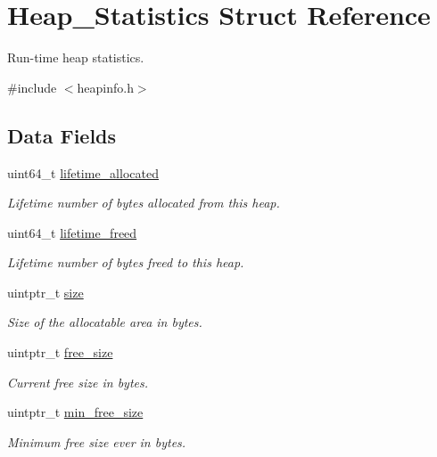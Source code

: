 \hypertarget{structHeap__Statistics}{}\section{Heap\+\_\+\+Statistics Struct Reference}
\label{structHeap__Statistics}


Run-\/time heap statistics.  




{\ttfamily \#include $<$heapinfo.\+h$>$}

\subsection*{Data Fields}
\begin{DoxyCompactItemize}
\item 
uint64\+\_\+t \mbox{\hyperlink{structHeap__Statistics_a511f505d0322a9217c82a5ef84e91900}{lifetime\+\_\+allocated}}
\begin{DoxyCompactList}\small\item\em Lifetime number of bytes allocated from this heap. \end{DoxyCompactList}\item 
uint64\+\_\+t \mbox{\hyperlink{structHeap__Statistics_a3b6ed31e7d4ef8b250ab5befc0cdcac9}{lifetime\+\_\+freed}}
\begin{DoxyCompactList}\small\item\em Lifetime number of bytes freed to this heap. \end{DoxyCompactList}\item 
uintptr\+\_\+t \mbox{\hyperlink{structHeap__Statistics_ab98e1923a329bf8fb80326ae6a4ee6be}{size}}
\begin{DoxyCompactList}\small\item\em Size of the allocatable area in bytes. \end{DoxyCompactList}\item 
uintptr\+\_\+t \mbox{\hyperlink{structHeap__Statistics_ac696ae80238c37378edbfd84d3c5dda7}{free\+\_\+size}}
\begin{DoxyCompactList}\small\item\em Current free size in bytes. \end{DoxyCompactList}\item 
uintptr\+\_\+t \mbox{\hyperlink{structHeap__Statistics_a590447e1582848eafb05821a0d0e794a}{min\+\_\+free\+\_\+size}}
\begin{DoxyCompactList}\small\item\em Minimum free size ever in bytes. \end{DoxyCompactList}\item 

\end{DoxyCompactItemize}
